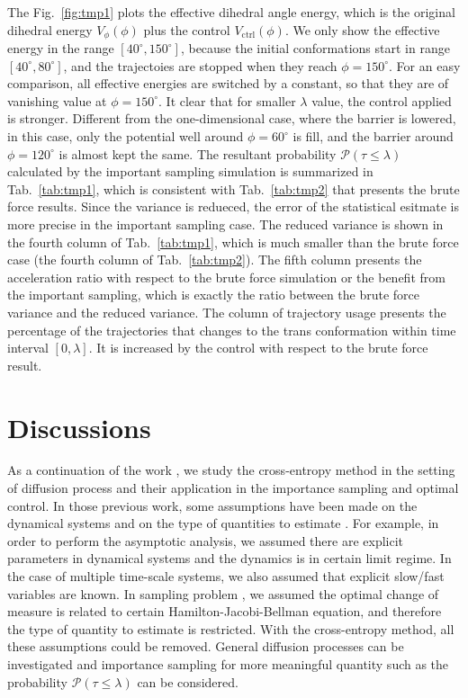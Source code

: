 \documentclass[final]{siamltex}
\begin{document}
The Fig.~\ref{fig:tmp1} plots the effective dihedral angle energy,
which is the original dihedral energy $V_\phi(\phi)$ plus the control
$V_{\textrm{ctrl}}(\phi)$. We only show the effective energy in the
range $[40^\circ, 150^\circ]$, because the initial
conformations start in range $[40^\circ, 80^\circ]$, and the
trajectoies are stopped when they reach $\phi = 150^\circ$. For an easy
comparison, all effective energies are switched by a constant, so that
they are of vanishing value at $\phi = 150^\circ$. It clear that for
smaller $\lambda$ value, the control applied is stronger. Different
from the one-dimensional case, where the barrier is lowered, in this
case, only the potential well around $\phi = 60^\circ$ is fill, and
the barrier around $\phi = 120^\circ$ is almost kept the same.  The
resultant probability $\mathcal{P} (\tau \leq \lambda)$ calculated by the
important sampling simulation is summarized in Tab.~\ref{tab:tmp1},
which is consistent with Tab.~\ref{tab:tmp2} that presents the
brute force results. Since the variance is redueced, the error of the
statistical esitmate is more precise in the important sampling case. The
reduced variance is shown in the fourth column of Tab.~\ref{tab:tmp1},
which is much smaller than the brute force case (the fourth column of
Tab.~\ref{tab:tmp2}). The fifth column presents the acceleration ratio
with respect to the brute force simulation or the benefit from the
important sampling, which is exactly the ratio between the brute force
variance and the reduced variance. The column of trajectory usage
presents the percentage of the trajectories that changes to the trans
conformation within time interval $[0, \lambda]$. It is increased by
the control with respect to the brute force result.




\section{Discussions}
\label{sec-discuss}

As a continuation of the work \cite{zlph2013, zhws13}, we study the cross-entropy
method in the setting of diffusion process and their application in the
importance sampling and optimal control.
In those previous work, some assumptions have been made on the dynamical systems and
on the type of quantities to estimate \cite{zhws13}. For example, 
in order to perform the asymptotic analysis, we assumed there are explicit parameters in dynamical systems and the dynamics
is in certain limit regime. In the case of multiple time-scale systems, we
also assumed that explicit slow/fast variables are known. In sampling problem \cite{zhws13}, we assumed 
the optimal change of measure is related to certain Hamilton-Jacobi-Bellman equation,
and therefore the type of quantity to estimate is restricted. With the
cross-entropy method, all these assumptions could be removed. General
diffusion processes can be investigated and importance sampling for more
meaningful quantity such as the probability $\mathcal{P}(\tau \le \lambda)$ can be considered.
\end{document}
